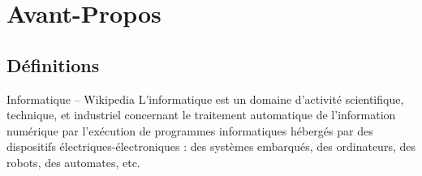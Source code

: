 \def\xxactivite{Cours}

\fichefalse \proftrue \tdfalse \courstrue

\def\xxnumchapitre{Chapitre 1 \vspace{.2cm}}
\def\xxchapitre{\hspace{.12cm} Découverte de l'algorithmique et de la programmation}

\def\xxcompetences{%
\textsl{%
\textbf{Savoirs et compétences :}\\
\begin{itemize}[label=\ding{112},font=\color{bleuxp}] 
\item \textit{Mod2.C1 : }Chaîne d’énergie et d'information
\item \textit{Mod2.C8 : }Linéarisation des systèmes non linéaires	
\item \textit{Mod3.C1 : }Point de fonctionnement : non-linéarités (hystérésis, saturation, seuil)
\end{itemize}
}}

\def\xxfigures{
}%



\setlength{\columnseprule}{.1pt}

\vspace{2cm}
\pagestyle{fancy}
\thispagestyle{plain}







\section{Avant-Propos}
\subsection{Définitions}

\begin{defi}{Informatique -- Wikipedia}
L'informatique est un domaine d'activité scientifique, technique, et industriel concernant le traitement automatique de l'information numérique par l'exécution de programmes informatiques hébergés par des dispositifs électriques-électroniques : des systèmes embarqués, des ordinateurs, des robots, des automates, etc.
\end{defi}

